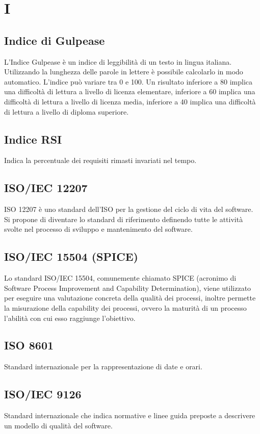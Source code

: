 {	\section{I}
	\subsection{Indice di Gulpease}
	L'Indice Gulpease è un indice di leggibilità di un testo in lingua italiana. Utilizzando la lunghezza delle parole in lettere è possibile calcolarlo in modo automatico. L'indice può variare tra 0 e 100. Un risultato inferiore a 80 implica una difficoltà di lettura a livello di licenza elementare, inferiore a 60 implica una difficoltà di lettura a livello di licenza media, inferiore a 40 implica una difficoltà di lettura a livello di diploma superiore.
	\subsection{Indice RSI}
	Indica la percentuale dei requisiti rimasti invariati nel tempo.
	
	\subsection{ISO/IEC 12207}
	ISO 12207 è uno standard dell'ISO per la gestione del ciclo di vita del software. Si propone di diventare lo standard di riferimento definendo tutte le attività svolte nel processo di sviluppo e mantenimento del software.
	
	\subsection{ISO/IEC 15504 (SPICE)}
	Lo standard ISO/IEC 15504, comunemente chiamato SPICE (acronimo di Software Process Improvement and Capability Determination), viene utilizzato per eseguire una valutazione concreta della qualità dei processi, inoltre permette la misurazione della capability dei processi, ovvero la maturità
	di un processo l’abilità con cui esso raggiunge l’obiettivo.
	
	\subsection{ISO 8601}
	Standard internazionale per la rappresentazione di date e orari.
	
	\subsection{ISO/IEC 9126}
	Standard internazionale che indica normative e linee guida preposte a descrivere un modello di qualità del software.
	
}
